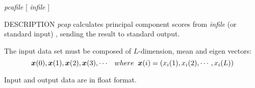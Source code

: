 % 
% 
% 
% 
%                                                                        
%
\def\Vec#1{\mbox{\boldmath $#1$}}

\begin{synopsis}
 \item[pcap] [ --l $L$ ] [ --n $N$] {\em pcafile} [ {\em infile} ] 
\end{synopsis}

\begin{qsection}{DESCRIPTION}
 {\em pcap} calculates principal component scores
 from {\em infile} (or standard input) ,
 sending the result to standard output.

 The input data set must be composed of $L$-dimension,
 mean and eigen vectors:
\[
 \Vec{x}(0), \Vec{x}(1), \Vec{x}(2), \Vec{x}(3), \cdots \;\;\;
 where\;\;\Vec{x}(i) = (x_{i}(1), x_{i}(2), \cdots, x_{i}(L))
\]

Input and output data are in float format. 
\end{qsection}

